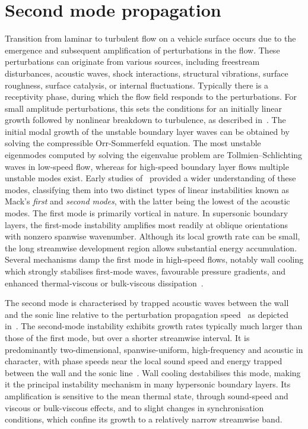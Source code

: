 \section{Second mode propagation}

Transition from laminar to turbulent flow on a vehicle surface occurs due to the emergence and subsequent amplification of perturbations in the flow. These perturbations can originate from various sources, including freestream disturbances, acoustic waves, shock interactions, structural vibrations, surface roughness, surface catalysis, or internal fluctuations. Typically there is a receptivity phase, during which the flow field responds to the perturbations. For small amplitude perturbations, this sets the conditions for an initially linear growth followed by nonlinear breakdown to turbulence, as described in~\cite{reshotko2008}. The initial modal growth of the unstable boundary layer waves can be obtained by solving the compressible Orr-Sommerfeld equation. The most unstable eigenmodes computed by solving the eigenvalue problem are Tollmien--Schlichting waves in low-speed flow, whereas for high-speed boundary layer flows multiple unstable modes exist. Early studies of~\cite{Mack1969} provided a wider understanding of these modes, classifying them into two distinct types of linear instabilities known as Mack's \textit{first} and \textit{second modes}, with the latter being the lowest of the acoustic modes. The first mode is primarily vortical in nature. In supersonic boundary layers, the first-mode instability amplifies most readily at oblique orientations with nonzero spanwise wavenumber. Although its local growth rate can be small, the long streamwise development region allows substantial energy accumulation. Several mechanisms damp the first mode in high-speed flows, notably wall cooling which strongly stabilises first-mode waves, favourable pressure gradients, and enhanced thermal-viscous or bulk-viscous dissipation~\citep{Mack1984}.

The second mode is characterised by trapped acoustic waves between the wall and the sonic line relative to the perturbation propagation speed~\citep{Fedorov2001} as depicted in~. The second-mode instability exhibits growth rates typically much larger than those of the first mode, but over a shorter streamwise interval. It is predominantly two-dimensional, spanwise-uniform, high-frequency and acoustic in character, with phase speeds near the local sound speed and energy trapped between the wall and the sonic line~\citep{DeTullio2013}. Wall cooling destabilises this mode, making it the principal instability mechanism in many hypersonic boundary layers. Its amplification is sensitive to the mean thermal state, through sound-speed and viscous or bulk-viscous effects, and to slight changes in synchronisation conditions, which confine its growth to a relatively narrow streamwise band.



